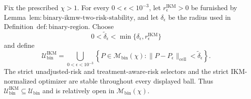 Fix the prescribed \(\chi>1\).  For every \(0<\epsilon<10^{-3}\), let \(r_\epsilon^{\mathrm{IKM}}>0\) be furnished by Lemma~\(\mathrm{lem{:}binary\text{-}ikmw\text{-}two\text{-}risk\text{-}stability}\), and let \(\delta_\epsilon\) be the radius used in Definition~\(\mathrm{def{:}binary\text{-}region}\).  Choose
\[
 0<\widetilde\delta_\epsilon
 <\min\{\delta_\epsilon,r_\epsilon^{\mathrm{IKM}}\}
\]
and define
\[
 \mathcal U_{\mathrm{bin}}^{\mathrm{IKM}}
 =\bigcup_{0<\epsilon<10^{-3}}
 \left\{P\in\mathcal M_{\mathrm{bin}}(\chi):
 \|P-P_\epsilon\|_{\mathrm{cell}}<\widetilde\delta_\epsilon\right\}.
\]
The strict unadjusted-risk and treatment-aware-risk selectors and the strict IKM-normalized optimizer are stable throughout every displayed ball.  Thus \(\mathcal U_{\mathrm{bin}}^{\mathrm{IKM}}\subseteq\mathcal U_{\mathrm{bin}}\) and is relatively open in \(\mathcal M_{\mathrm{bin}}(\chi)\).